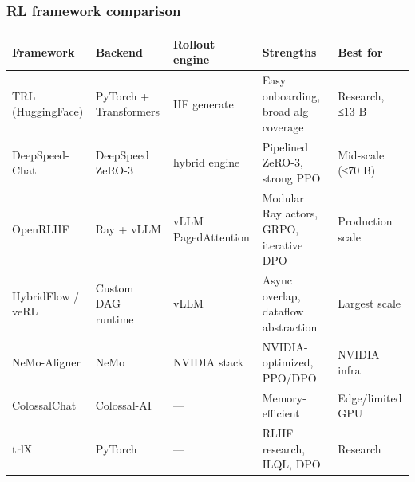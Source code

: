 \subsubsection{RL framework comparison}\label{rl-framework-comparison}

{\def\LTcaptype{none} %
\begin{longtable}[]{@{}
  >{\raggedright\arraybackslash}p{}
  >{\raggedright\arraybackslash}p{}
  >{\raggedright\arraybackslash}p{}
  >{\raggedright\arraybackslash}p{}
  >{\raggedright\arraybackslash}p{}@{}}
\toprule\noalign{}
\begin{minipage}[b]{\linewidth}\raggedright
Framework
\end{minipage} & \begin{minipage}[b]{\linewidth}\raggedright
Backend
\end{minipage} & \begin{minipage}[b]{\linewidth}\raggedright
Rollout engine
\end{minipage} & \begin{minipage}[b]{\linewidth}\raggedright
Strengths
\end{minipage} & \begin{minipage}[b]{\linewidth}\raggedright
Best for
\end{minipage} \\
\midrule\noalign{}
\endhead
\bottomrule\noalign{}
\endlastfoot
TRL (HuggingFace) & PyTorch + Transformers & HF generate & Easy onboarding, broad alg coverage & Research, ≤13 B \\
DeepSpeed-Chat & DeepSpeed ZeRO-3 & hybrid engine & Pipelined ZeRO-3, strong PPO & Mid-scale (≤70 B) \\
OpenRLHF & Ray + vLLM & vLLM PagedAttention & Modular Ray actors, GRPO, iterative DPO & Production scale \\
HybridFlow / veRL & Custom DAG runtime & vLLM & Async overlap, dataflow abstraction & Largest scale \\
NeMo-Aligner & NeMo & NVIDIA stack & NVIDIA-optimized, PPO/DPO & NVIDIA infra \\
ColossalChat & Colossal-AI & --- & Memory-efficient & Edge/limited GPU \\
trlX & PyTorch & --- & RLHF research, ILQL, DPO & Research \\
\end{longtable}
}

